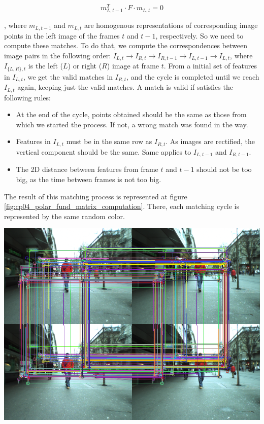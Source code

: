 \begin{framed}
\begin{equation}\label{eq:cp04_fundamental_matrix}
m_{L,t - 1}^T \cdot F \cdot m_{L,t}= 0
\end{equation}

, where $m_{L,t - 1}$ and $m_{L,t}$ are homogenous representations of corresponding image points in the left image of the frames $t$ and $t - 1$, respectively. So we need to compute these matches. To do that, we compute the correspondences between image pairs in the following order: $I_{L, t} \rightarrow I_{R, t} \rightarrow I_{R, t - 1} \rightarrow I_{L, t - 1} \rightarrow I_{L, t}$, where $I_{\{L,R\},t}$ is the left ($L$) or right ($R$) image at frame $t$. From a initial set of features in $I_{L, t}$, we get the valid matches in $I_{R, t}$, and the cycle is completed until we reach $I_{L, t}$ again, keeping just the valid matches. A match is valid if satisfies the following rules:
\begin{itemize}
 \item At the end of the cycle, points obtained should be the same as those from which we started the process. If not, a wrong match was found in the way.
 \item Features in $I_{L, t}$ must be in the same row as $I_{R, t}$. As images are rectified, the vertical component should be the same. Same applies to $I_{L, t - 1}$ and $I_{R, t - 1}$.
 \item The 2D distance between features from frame $t$ and $t - 1$ should not be too big, as the time between frames is not too big.
\end{itemize}

The result of this matching process is represented at figure \ref{fig:cp04_polar_fund_matrix_computation}. There, each matching cycle is represented by the same random color.

\begin{center}
\includegraphics{fundamentalMatrixComputation}
\label{fig:cp04_polar_fund_matrix_computation}
\end{center}


\end{framed}
